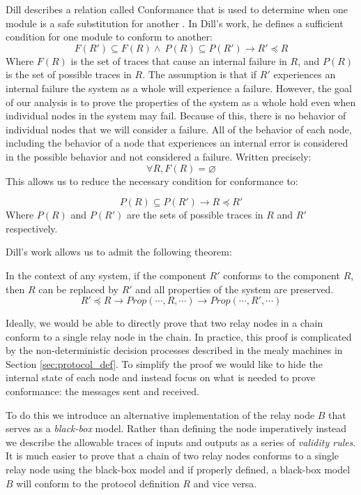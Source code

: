 \documentclass[runningheads]{llncs}
\newcommand{\secref}[1]{Section \ref{#1}}
\newif\ifcomments
\newif\ifkylecomments
\newcommand{\egm}[1]{\ifcomments\textcolor{orange}{egm: #1}\fi}
\newcommand{\krs}[1]{\ifkylecomments\textcolor{blue}{krs: #1}\fi}
\begin{document}
Dill describes a relation called Conformance that is used to determine when one module is a safe substitution for another \cite{dill_trace_theory}.
In Dill's work, he defines a sufficient condition for one module to conform to another:
$$F(R') \subseteq F(R) \wedge\ P(R) \subseteq P(R') \longrightarrow R' \preceq R$$
Where $F(R)$ is the set of traces that cause an internal failure in $R$, and $P(R)$ is the set of possible traces in $R$. 
The assumption is that if $R'$ experiences an internal failure the system as a whole will experience a failure. However, the goal of our analysis is to prove the properties of the system as a whole hold even when individual nodes in the system may fail. Because of this, there is no behavior of individual nodes that we will consider a failure. All of the behavior of each node, including the behavior of a node that experiences an internal error is considered in the possible behavior and not considered a failure. Written precisely:
$$
\forall R, F(R) = \varnothing
$$
This allows us to reduce the necessary condition for conformance to:

\begin{definition}[Conformance]
\label{def:conformance}
$$P(R) \subseteq P(R') \longrightarrow R \preceq R'$$
Where $P(R)$ and $P(R')$ are the sets of possible traces in $R$ and $R'$ respectively. 
\end{definition}

Dill's work allows us to admit the following theorem: 
\begin{theorem}
\label{theorem:dill}
 In the context of any system, if the component $R'$ conforms to the component $R$, then $R$ can be replaced by $R'$ and all properties of the system are preserved.
$$R' \preceq R \longrightarrow Prop(\dotsm, R, \dotsm) \longrightarrow Prop(\dotsm, R', \dotsm)
$$
\end{theorem}

Ideally, we would be able to directly prove that two relay nodes in a chain conform to a single relay node in the chain. In practice, this proof is complicated by the non-deterministic decision processes described in the mealy machines in \secref{sec:protocol_def}. To simplify the proof we would like to hide the internal state of each node and instead focus on what is needed to prove conformance: the messages sent and received.

\krs{Good call. Changed to \emph{Ref} and $\Delta$ \egm{A brief word on notation. Earlier, $B$ is used for balance, and $R$ is used for referee. Not super ideal because now $R$ is the white-box version of the relay and $B$ in the black-box version of the relay. Maybe find something different for the balance and referee earlier?}}
To do this we introduce an alternative implementation of the relay node $B$ that serves as a \emph{black-box} model. Rather than defining the node imperatively instead we describe the allowable traces of inputs and outputs as a series of \emph{validity rules}. 
It is much easier to prove that a chain of two relay nodes conforms to a single relay node using the black-box model and if properly defined, a black-box model $B$ will conform to the protocol definition $R$ and vice versa.
\end{document}
